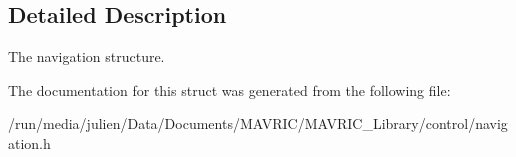 \subsection{Detailed Description}
The navigation structure. 

The documentation for this struct was generated from the following file\+:\begin{DoxyCompactItemize}
\item 
/run/media/julien/\+Data/\+Documents/\+M\+A\+V\+R\+I\+C/\+M\+A\+V\+R\+I\+C\+\_\+\+Library/control/navigation.\+h\end{DoxyCompactItemize}
